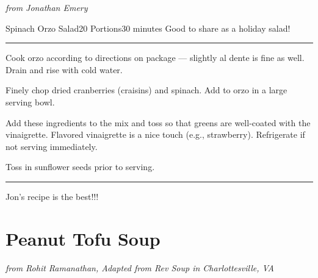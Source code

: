 \documentclass[openany]{book}
\begin{document}
\emph{from Jonathan Emery}

\begin{recipe}{Spinach Orzo Salad}{20 Portions}{30 minutes}
\freeform Good to share as a holiday salad!
\freeform\rule{\textwidth}{0.05pt}

Cook orzo according to directions on package --- slightly al dente is fine as well. Drain and rise with cold water.


Finely chop dried cranberries (craisins) and spinach. Add to orzo in a large serving bowl.


Add these ingredients to the mix and toss so that greens are well-coated with the vinaigrette. Flavored vinaigrette is a nice touch (e.g., strawberry). Refrigerate if not serving immediately.


Toss in sunflower seeds prior to serving.

\freeform\rule{\textwidth}{0.05pt}

\freeform Jon's recipe is the best!!!

\end{recipe}

\chapter{Peanut Tofu Soup}\label{peanut-tofu-soup}

\emph{from Rohit Ramanathan, Adapted from Rev Soup in Charlottesville,
VA}
\end{document}
